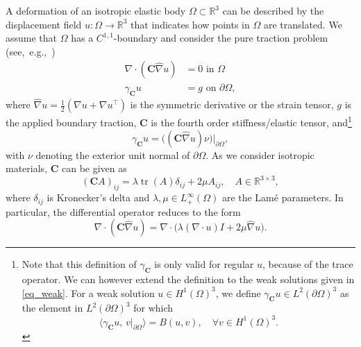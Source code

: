 \documentclass[reqno]{amsart}
\numberwithin{equation}{section}
\numberwithin{figure}{section}
\numberwithin{table}{section}
\newcommand{\inner}[1]{\langle#1\rangle}
\newcommand{\R}{\mathbb{R}}
\newcommand{\C}{\mathbf{C}}
\newcommand{\p}{\partial}
\newcommand\Tr{\operatorname{tr}} %
\theoremstyle{definition}
\theoremstyle{plain}
\theoremstyle{definition}
\theoremstyle{remark}
\numberwithin{equation}{section}
\begin{document}
A deformation of an isotropic elastic body $\Omega \subset \R^3$ can  be described by the displacement field $u \colon \Omega \to \R^3$ that indicates how points in $\Omega$ are translated. We assume that $\Omega$ has a $C^{1,1}$-boundary and consider the pure traction problem (see,~e.g.,~\cite{Ci88})
%
\begin{align*}
	\nabla \cdot (\C\widehat{\nabla} u )  &= 0  \text{ in } \Omega \\
	\gamma_{\C} u &= g \text{ on }\partial\Omega,
\end{align*}
%
where $\widehat{\nabla} u  = \frac{1}{2}(\nabla u + \nabla u^\top)$ is the symmetric derivative or the strain tensor, $g$ is the applied boundary traction, $\C$ is the fourth order stiffness/elastic tensor, 
and\footnote{
	Note that this definition of $\gamma_{\mathbf C}$ is only valid for regular $u$, because of the trace operator. We can however extend the definition to the weak solutions given in \eqref{eq_weak}. For a weak solution $u \in H^1(\Omega)^3$, we define $\gamma_{\mathbf{C}} u \in L^2(\p \Omega)^3$ as the element in $L^2(\p\Omega)^3$ for which
	\begin{equation*} 
		\inner{\gamma_{\mathbf{C}} u, \, v|_{\p \Omega}} = B(u,v), \quad \forall v \in H^1(\Omega)^3. 
	\end{equation*}
}
%
\begin{equation} \label{eq_gamma}
	\gamma_{\mathbf C} u = \bigl((\C\widehat{\nabla} u ) \nu\bigr)|_{\p \Omega},
\end{equation}
%
with $\nu$ denoting the exterior unit normal of $\partial \Omega$.
As we consider isotropic materials, $\C$ can be given as 
%
\begin{equation*} 
	(\C A)_{ij} =  \lambda \Tr(A) \delta_{ij} + 2\mu A_{ij}, \quad A \in \R^{3 \times 3},
\end{equation*}
%
where $\delta_{ij}$ is Kronecker's delta and $\lambda,\mu \in L^\infty_+(\Omega)$ are the Lamé parameters. In particular, the differential operator reduces to the form 
%
\begin{equation*}
	\nabla \cdot (\C\widehat{\nabla} u ) = \nabla \cdot \big(  \lambda (\nabla \cdot u) I + 2 \mu \widehat{\nabla} u  \big).
\end{equation*}
\end{document}
